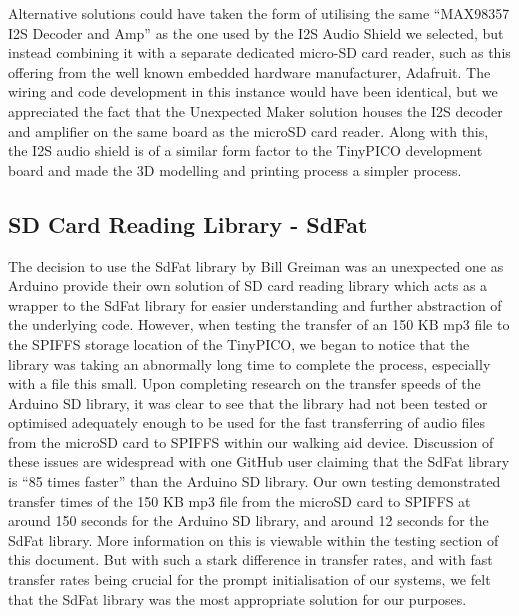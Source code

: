             Alternative solutions could have taken the form of utilising the same ``MAX98357 I2S Decoder and Amp'' \cite{unexpected_maker} as the one used by the I2S Audio Shield we selected, but instead combining it with a separate dedicated micro-SD card reader, such as this offering \cite{ada_2022} from the well known embedded hardware manufacturer, Adafruit. The wiring and code development in this instance would have been identical, but we appreciated the fact that the Unexpected Maker solution houses the I2S decoder and amplifier on the same board as the microSD card reader. Along with this, the I2S audio shield is of a similar form factor to the TinyPICO development board and made the 3D modelling and printing process a simpler process.

        \subsection{SD Card Reading Library - SdFat}
        \label{subsec:sdfat}

            The decision to use the SdFat library by Bill Greiman \cite{greiman} was an unexpected one as Arduino provide their own solution of SD card reading library \cite{arduino} which acts as a wrapper to the SdFat library for easier understanding and further abstraction of the underlying code. However, when testing the transfer of an 150 KB mp3 file to the SPIFFS storage location of the TinyPICO, we began to notice that the library was taking an abnormally long time to complete the process, especially with a file this small. Upon completing research on the transfer speeds of the Arduino SD library, it was clear to see that the library had not been tested or optimised adequately enough to be used for the fast transferring of audio files from the microSD card to SPIFFS within our walking aid device. Discussion of these issues are widespread \cite{fat16lib_2011,drdooom_2019} with one GitHub user claiming that the SdFat library is ``85 times faster'' \cite{kas2_2018} than the Arduino SD library. Our own testing demonstrated transfer times of the 150 KB mp3 file from the microSD card to SPIFFS at around 150 seconds for the Arduino SD library, and around 12 seconds for the SdFat library. More information on this is viewable within the testing section of this document. But with such a stark difference in transfer rates, and with fast transfer rates being crucial for the prompt initialisation of our systems, we felt that the SdFat library was the most appropriate solution for our purposes.
                
